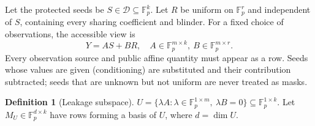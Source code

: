\documentclass[pdflatex,sn-mathphys-num]{sn-jnl}%
\theoremstyle{plain}
\theoremstyle{definition}
\newtheorem{definition}[theorem]{Definition}
\newcommand{\F}{\mathbb{F}}
\begin{document}
Let the protected seeds be $S\in \mathcal D\subseteq\F_p^k$. Let $R$ be uniform on $\F_p^r$ and independent of $S$, containing every sharing coefficient and blinder. For a fixed choice of observations, the accessible view is
\begin{equation}\label{eq:view}
 Y=AS+BR,\quad A\in\F_p^{m\times k},\ B\in\F_p^{m\times r}.
\end{equation}
Every observation source and public affine quantity must appear as a row. Seeds whose values are given (conditioning) are substituted and their contribution subtracted; seeds that are unknown but not uniform are never treated as masks.

\begin{definition}[Leakage subspace]
$U=\{\lambda A:\lambda\in\F_p^{1\times m},\ \lambda B=0\}\subseteq\F_p^{1\times k}$. Let $M_U\in\F_p^{d\times k}$ have rows forming a basis of $U$, where $d=\dim U$.
\end{definition}
\end{document}
